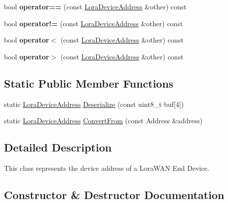 \begin{DoxyCompactItemize}
bool {\bfseries operator==} (const \hyperlink{classns3_1_1lorawan_1_1LoraDeviceAddress}{Lora\+Device\+Address} \&other) const
\item 
\mbox{\label{classns3_1_1lorawan_1_1LoraDeviceAddress_ab73d3318a1ff5613023d97d35fe8cd1e}} 
bool {\bfseries operator!=} (const \hyperlink{classns3_1_1lorawan_1_1LoraDeviceAddress}{Lora\+Device\+Address} \&other) const
\item 
\mbox{\label{classns3_1_1lorawan_1_1LoraDeviceAddress_aa2a2d80d77da9c8b082e8992c1bf7214}} 
bool {\bfseries operator$<$} (const \hyperlink{classns3_1_1lorawan_1_1LoraDeviceAddress}{Lora\+Device\+Address} \&other) const
\item 
\mbox{\label{classns3_1_1lorawan_1_1LoraDeviceAddress_a8e096e9c04f302907c403449d2fa728f}} 
bool {\bfseries operator$>$} (const \hyperlink{classns3_1_1lorawan_1_1LoraDeviceAddress}{Lora\+Device\+Address} \&other) const
\end{DoxyCompactItemize}
\subsection*{Static Public Member Functions}
\begin{DoxyCompactItemize}
\item 
static \hyperlink{classns3_1_1lorawan_1_1LoraDeviceAddress}{Lora\+Device\+Address} \hyperlink{classns3_1_1lorawan_1_1LoraDeviceAddress_a440a7f5011c5051efed2aa7d5ae6c5f4}{Deserialize} (const uint8\+\_\+t buf\mbox{[}4\mbox{]})
\item 
static \hyperlink{classns3_1_1lorawan_1_1LoraDeviceAddress}{Lora\+Device\+Address} \hyperlink{classns3_1_1lorawan_1_1LoraDeviceAddress_a4af705a1745ff8e6ced236cde559acf7}{Convert\+From} (const Address \&address)
\end{DoxyCompactItemize}


\subsection{Detailed Description}
This class represents the device address of a Lora\+W\+AN End Device. 

\subsection{Constructor \& Destructor Documentation}
\mbox{\label{classns3_1_1lorawan_1_1LoraDeviceAddress_a6aaf11c0f5ffc5da8dad5bdee0af961a}} 

